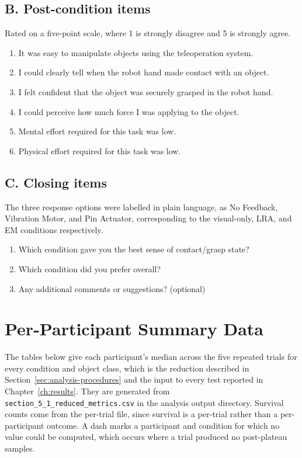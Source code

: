 \documentclass[12pt, a4paper, twoside, openright]{report}
\begin{document}
\section*{B. Post-condition items}

Rated on a five-point scale, where 1 is strongly disagree and 5 is strongly
agree.

\begin{enumerate}[label=B\arabic*., widest=B10., leftmargin=*]
    \item It was easy to manipulate objects using the teleoperation system.
    \item I could clearly tell when the robot hand made contact with an object.
    \item I felt confident that the object was securely grasped in the robot
          hand.
    \item I could perceive how much force I was applying to the object.
    \item Mental effort required for this task was low.
    \item Physical effort required for this task was low.
\end{enumerate}

\section*{C. Closing items}

The three response options were labelled in plain language, as No Feedback,
Vibration Motor, and Pin Actuator, corresponding to the visual-only, LRA, and
EM conditions respectively.

\begin{enumerate}[label=C\arabic*., widest=C10., leftmargin=*]
    \item Which condition gave you the best sense of contact/grasp state?
    \item Which condition did you prefer overall?
    \item Any additional comments or suggestions? (optional)
\end{enumerate}

\chapter{Per-Participant Summary Data}
\label{app:data}

The tables below give each participant's median across the five repeated trials
for every condition and object class, which is the reduction described in
Section~\ref{sec:analysis-procedures} and the input to every test reported in
Chapter~\ref{ch:results}. They are generated from
\texttt{section\_5\_1\_reduced\_metrics.csv} in the analysis output
directory. Survival counts
come from the per-trial file, since survival is a per-trial rather than a
per-participant outcome. A dash marks a participant and condition for which no
value could be computed, which occurs where a trial produced no post-plateau
samples.
\end{document}
